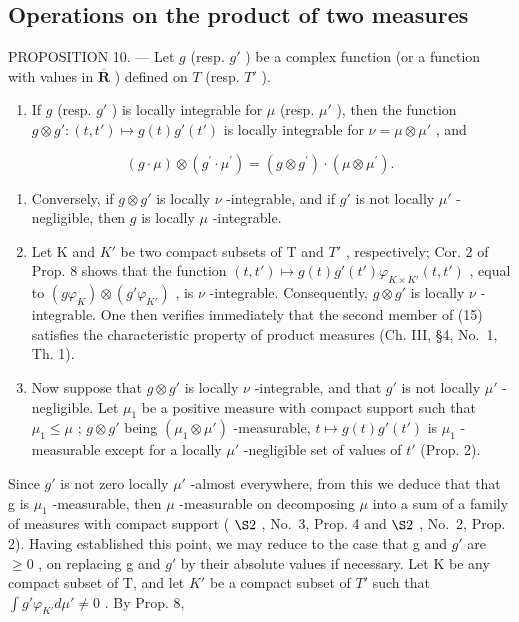 \subsection{Operations on the product of two measures}

PROPOSITION 10. --- Let \(g\) (resp. \(g'\) ) be a complex function (or a function with values in \(\overline{\mathbf{R}}\) ) defined on \(T\) (resp. \(T'\) ).

\begin{enumerate}
\def\labelenumi{\alph{enumi})}
\tightlist
\item
  If \(g\) (resp. \(g'\) ) is locally integrable for \(\mu\) (resp. \(\mu'\) ), then the function \(g \otimes g': (t, t') \mapsto g(t)g'(t')\) is locally integrable for \(\nu = \mu \otimes \mu'\) , and
\end{enumerate}

\[
(g \cdot \mu) \otimes (g ^ {\prime} \cdot \mu^ {\prime}) = (g \otimes g ^ {\prime}) \cdot (\mu \otimes \mu^ {\prime}).\tag{15}
\]

\begin{enumerate}
\def\labelenumi{\alph{enumi})}
\setcounter{enumi}{1}
\item
  Conversely, if \(g \otimes g'\) is locally \(\nu\) -integrable, and if \(g'\) is not locally \(\mu'\) -negligible, then \(g\) is locally \(\mu\) -integrable.
\item
  Let K and \(K'\) be two compact subsets of T and \(T'\) , respectively; Cor. 2 of Prop. 8 shows that the function \((t, t') \mapsto g(t)g'(t')\varphi_{K \times K'}(t, t')\) , equal to \((g\varphi_{K}) \otimes (g'\varphi_{K'})\) , is \(\nu\) -integrable. Consequently, \(g \otimes g'\) is locally \(\nu\) -integrable. One then verifies immediately that the second member of (15) satisfies the characteristic property of product measures (Ch. III, §4, No.~1, Th. 1).
\item
  Now suppose that \(g \otimes g'\) is locally \(\nu\) -integrable, and that \(g'\) is not locally \(\mu'\) -negligible. Let \(\mu_1\) be a positive measure with compact support such that \(\mu_1 \leqslant \mu\) ; \(g \otimes g'\) being \((\mu_1 \otimes \mu')\) -measurable, \(t \mapsto g(t)g'(t')\) is \(\mu_1\) -measurable except for a locally \(\mu'\) -negligible set of values of \(t'\) (Prop. 2).
\end{enumerate}

Since \(g'\) is not zero locally \(\mu'\) -almost everywhere, from this we deduce that that g is \(\mu_{1}\) -measurable, then \(\mu\) -measurable on decomposing \(\mu\) into a sum of a family of measures with compact support ( \(\S2\) , No.~3, Prop. 4 and \(\S2\) , No.~2, Prop. 2). Having established this point, we may reduce to the case that g and \(g'\) are \(\geqslant0\) , on replacing g and \(g'\) by their absolute values if necessary. Let K be any compact subset of T, and let \(K'\) be a compact subset of \(T'\) such that \(\int g'\varphi_{K'}d\mu'\neq0\) . By Prop. 8,

